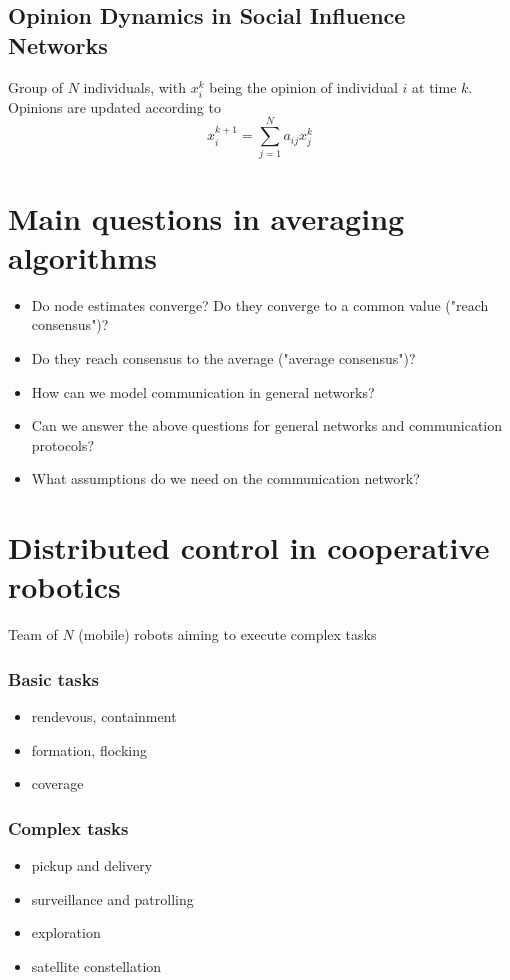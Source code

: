 \documentclass{book}
\theoremstyle{theoremv2}
\theoremstyle{defv2}
\theoremstyle{remark}
\theoremstyle{remark}
\theoremstyle{definition}
\theoremstyle{definition}
\begin{document}
\subsection{Opinion Dynamics in Social Influence Networks}
Group of $N$ individuals, with $x_i^k$ being the opinion of individual $i$ at time $k$. Opinions are updated according to 
\[
    x_i^{k+1} = \displaystyle\sum_{j=1}^{N}a_{ij}x_j^k
\]


\section{Main questions in averaging algorithms}
\begin{itemize}
    \item Do node estimates converge? Do they converge to a common value ("reach consensus")?
    \item Do they reach consensus to the average ("average consensus")?
    \item How can we model communication  in general networks?
    \item Can we answer the above questions for general networks and communication protocols?
    \item What assumptions do we need on the communication network?
\end{itemize}

\section{Distributed control in cooperative robotics}
Team of $N$ (mobile) robots aiming to execute complex tasks
\subsubsection{Basic tasks}
\begin{itemize}
    \item rendevous, containment
    \item formation, flocking
    \item coverage
\end{itemize}
\subsubsection{Complex tasks}
\begin{itemize}
    \item pickup and delivery
    \item surveillance and patrolling
    \item exploration
    \item satellite constellation
\end{itemize}
\end{document}
